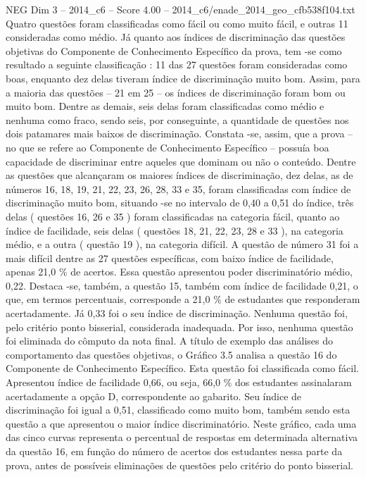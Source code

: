 \begin{textsample}{NEG Dim 3 – 2014\_c6 – Score 4.00 – 2014\_c6/enade\_2014\_geo\_cfb538f104.txt}
Quatro questões foram classificadas como fácil ou como muito fácil, e outras 11 consideradas como médio.
Já quanto aos índices de discriminação das questões objetivas do Componente de Conhecimento Específico da prova, tem -se como resultado a seguinte classificação : 11 das 27 questões foram consideradas como boas, enquanto dez delas tiveram índice de discriminação muito bom.
Assim, para a maioria das questões – 21 em 25 – os índices de discriminação foram bom ou muito bom.
Dentre as demais, seis delas foram classificadas como médio e nenhuma como fraco, sendo seis, por conseguinte, a quantidade de questões nos dois patamares mais baixos de discriminação.
Constata -se, assim, que a prova – no que se refere ao Componente de Conhecimento Específico – possuía boa capacidade de discriminar entre aqueles que dominam ou não o conteúdo.
Dentre as questões que alcançaram os maiores índices de discriminação, dez delas, as de números 16, 18, 19, 21, 22, 23, 26, 28, 33 e 35, foram classificadas com índice de discriminação muito bom, situando -se no intervalo de 0,40 a 0,51 do índice, três delas ( questões 16, 26 e 35 ) foram classificadas na categoria fácil, quanto ao índice de facilidade, seis delas ( questões 18, 21, 22, 23, 28 e 33 ), na categoria médio, e a outra ( questão 19 ), na categoria difícil.
A questão de número 31 foi a mais difícil dentre as 27 questões específicas, com baixo índice de facilidade, apenas 21,0 \% de acertos.
Essa questão apresentou poder discriminatório médio, 0,22.
Destaca -se, também, a questão 15, também com índice de facilidade 0,21, o que, em termos percentuais, corresponde a 21,0 \% de estudantes que responderam acertadamente.
Já 0,33 foi o seu índice de discriminação.
Nenhuma questão foi, pelo critério ponto bisserial, considerada inadequada.
Por isso, nenhuma questão foi eliminada do cômputo da nota final.
A título de exemplo das análises do comportamento das questões objetivas, o Gráfico 3.5 analisa a questão 16 do Componente de Conhecimento Específico.
Esta questão foi classificada como fácil.
Apresentou índice de facilidade 0,66, ou seja, 66,0 \% dos estudantes assinalaram acertadamente a opção D, correspondente ao gabarito.
Seu índice de discriminação foi igual a 0,51, classificado como muito bom, também sendo esta questão a que apresentou o maior índice discriminatório.
Neste gráfico, cada uma das cinco curvas representa o percentual de respostas em determinada alternativa da questão 16, em função do número de acertos dos estudantes nessa parte da prova, antes de possíveis eliminações de questões pelo critério do ponto bisserial.

\end{textsample}
